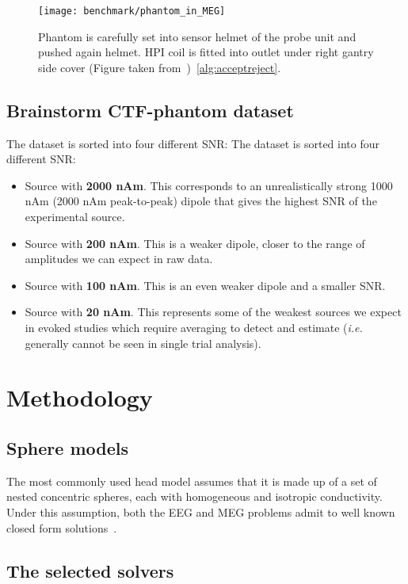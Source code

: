 \begin{figure}[tb]
   \centering
\texttt{[image: benchmark/phantom\_in\_MEG]}
\caption{Phantom is carefully set into sensor helmet of the probe unit and pushed again helmet. HPI coil is fitted into outlet under right gantry side cover (Figure taken from~\cite{hazim2015magnetoencephalography})~\ref{alg:acceptreject}.}
   \label{fig:phantom_in_MEG}
\end{figure}


\subsection{Brainstorm CTF-phantom dataset}

The dataset is sorted into four different SNR:
The dataset is sorted into four different SNR:
\begin{itemize}
\item Source with \textbf{2000 nAm}. This corresponds to an unrealistically strong 1000 nAm (2000 nAm peak-to-peak) dipole that gives the highest SNR of the experimental source.
\item Source with \textbf{200 nAm}. This is a weaker dipole, closer to the range of amplitudes we can expect in raw data.
\item Source with \textbf{100 nAm}. This is an even weaker dipole and a smaller SNR.
\item Source with \textbf{20 nAm}. This represents some of the weakest sources we expect in evoked studies which require averaging to detect and estimate (\textit{i.e.} generally cannot be seen in single trial analysis).
\end{itemize}

\section{Methodology}

\subsection{Sphere models}
The most commonly used head model assumes that it is made up of a set of nested concentric spheres, each with homogeneous and isotropic conductivity. Under this assumption, both the EEG and MEG problems admit to well known closed form solutions~\cite{mosher1999eeg}.

\subsection{The selected solvers}
